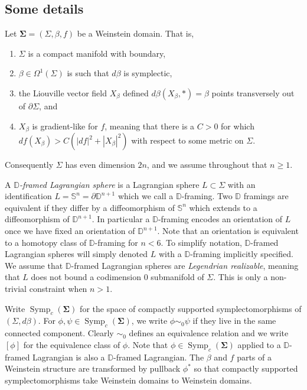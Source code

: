 \documentclass[11pt]{amsart}
\DeclareMathOperator{\Symp}{Symp}
\newcommand{\thicc}[1]{\pmb{#1}}
\newcommand{\disk}{\mathbb{D}}
\newcommand{\be}{\begin{enumerate}}
\newcommand{\ee}{\end{enumerate}}
\newcommand{\sphere}{\mathbb{S}}
\begin{document}
\subsection{Some details}

Let $\thicc{\Sigma} = (\Sigma, \beta, f)$ be a Weinstein domain. That is,
\be
\item $\Sigma$ is a compact manifold with boundary,
\item $\beta \in \Omega^{1}(\Sigma)$ is such that $d\beta$ is symplectic,
\item the Liouville vector field $X_{\beta}$ defined $d\beta(X_{\beta}, \ast) = \beta$ points transversely out of $\partial \Sigma$, and
\item $X_{\beta}$ is gradient-like for $f$, meaning that there is a $C > 0$ for which $df(X_{\beta}) > C(|df|^{2} + |X_{\beta}|^{2})$ with respect to some metric on $\Sigma$.
\ee
Consequently $\Sigma$ has even dimension $2n$, and we assume throughout that $n \geq 1$.

A \emph{$\disk$-framed Lagrangian sphere} is a Lagrangian sphere $L \subset \Sigma$ with an identification $L = \sphere^{n} = \partial \disk^{n+1}$ which we call a $\disk$-framing. Two $\disk$ framings are equivalent if they differ by a diffeomorphism of $\sphere^{n}$ which extends to a diffeomorphism of $\disk^{n+1}$. In particular a $\disk$-framing encodes an orientation of $L$ once we have fixed an orientation of $\disk^{n+1}$. Note that an orientation is equivalent to a homotopy class of $\disk$-framing for $n < 6$. To simplify notation, $\disk$-framed Lagrangian spheres will simply denoted $L$ with a $\disk$-framing implicitly specified. We assume that $\disk$-framed Lagrangian spheres are \emph{Legendrian realizable}, meaning that $L$ does not bound a codimension $0$ submanifold of $\Sigma$. This is only a non-trivial constraint when $n > 1$.

Write $\Symp_{c}(\thicc{\Sigma})$ for the space of compactly supported symplectomorphisms of $(\Sigma, d\beta)$. For $\phi, \psi \in \Symp_{c}(\thicc{\Sigma})$, we write $\phi \sim_{0} \psi$ if they live in the same connected component. Clearly $\sim_{0}$ defines an equivalence relation and we write $[\phi]$ for the equivalence class of $\phi$. Note that $\phi \in \Symp_{c}(\thicc{\Sigma})$ applied to a $\disk$-framed Lagrangian is also a $\disk$-framed Lagrangian. The $\beta$ and $f$ parts of a Weinstein structure are transformed by pullback $\phi^{\ast}$ so that compactly supported symplectomorphisms take Weinstein domains to Weinstein domains.
\end{document}
